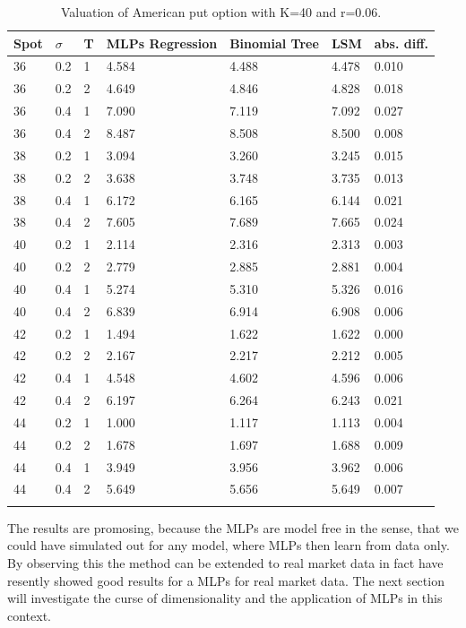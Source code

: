\begin{table}[th]
\caption{Valuation of American put option with K=40 and r=0.06.}
\label{tab:treatments}
\centering
\begin{tabular}{l l l l l l l }
\toprule
\textbf{Spot} & \textbf{$\sigma$} & \textbf{T} & \textbf{MLPs Regression} & \textbf{Binomial Tree} & \textbf{LSM} & \textbf{abs. diff.} \\
\midrule
36 & 0.2 & 1 & 4.584 & 4.488 & 4.478 & 0.010\\
36 & 0.2 & 2 & 4.649 & 4.846 & 4.828 & 0.018\\
36 & 0.4 & 1 & 7.090 & 7.119 & 7.092 & 0.027\\
36 & 0.4 & 2 & 8.487 & 8.508 & 8.500 & 0.008\\
38 & 0.2 & 1 & 3.094 & 3.260 & 3.245 & 0.015\\
38 & 0.2 & 2 & 3.638 & 3.748 & 3.735 & 0.013\\
38 & 0.4 & 1 & 6.172 & 6.165 & 6.144 & 0.021\\
38 & 0.4 & 2 & 7.605 & 7.689 & 7.665 & 0.024\\
40 & 0.2 & 1 & 2.114 & 2.316 & 2.313 & 0.003\\
40 & 0.2 & 2 & 2.779 & 2.885 & 2.881 & 0.004\\
40 & 0.4 & 1 & 5.274 & 5.310 & 5.326 & 0.016\\
40 & 0.4 & 2 & 6.839 & 6.914 & 6.908 & 0.006\\
42 & 0.2 & 1 & 1.494 & 1.622 & 1.622 & 0.000\\
42 & 0.2 & 2 & 2.167 & 2.217 & 2.212 & 0.005\\
42 & 0.4 & 1 & 4.548 & 4.602 & 4.596 & 0.006\\
42 & 0.4 & 2 & 6.197 & 6.264 & 6.243 & 0.021\\
44 & 0.2 & 1 & 1.000 & 1.117 & 1.113 & 0.004\\
44 & 0.2 & 2 & 1.678 & 1.697 & 1.688 & 0.009\\
44 & 0.4 & 1 & 3.949 & 3.956 & 3.962 & 0.006\\
44 & 0.4 & 2 & 5.649 & 5.656 & 5.649 & 0.007\\
\bottomrule\\
\end{tabular}
\end{table}


The results are promosing, because the MLPs are model free in the sense, that we could have simulated out for any model, where MLPs then learn from data only. By observing this the method can be extended to real market data in fact \parencite{GasparRaquel20} have resently showed good results for a MLPs for real market data. The next section will investigate the curse of dimensionality and the application of MLPs in this context.
\parencite{FergusonRyan2018}









